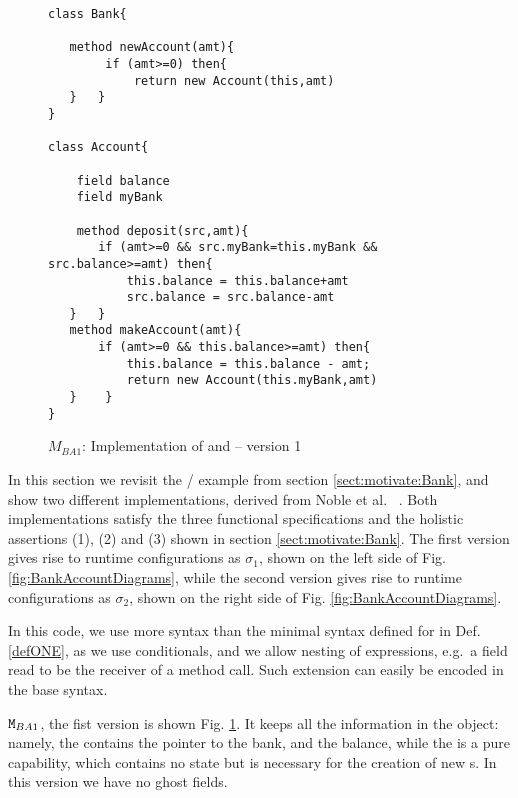 \begin{figure}[thb]
\begin{lstlisting}
class Bank{

   method newAccount(amt){
        if (amt>=0) then{
            return new Account(this,amt)
   }   }
}

class Account{

    field balance
    field myBank
    
    method deposit(src,amt){
       if (amt>=0 && src.myBank=this.myBank && src.balance>=amt) then{
           this.balance = this.balance+amt
           src.balance = src.balance-amt
   }   }
   method makeAccount(amt){
       if (amt>=0 && this.balance>=amt) then{
           this.balance = this.balance - amt;
           return new Account(this.myBank,amt)
   }    }
}
\end{lstlisting}
 \vspace*{-7mm}
\caption{$M_{BA1}$: Implementation of  and  -- version 1}
\label{fig:BanAccImplV1}
\end{figure}

In this section we revisit the / example from
 section  \ref{sect:motivate:Bank}, and show two different
 implementations, derived from Noble et al.\ \cite{arnd18} . Both implementations  satisfy the three functional specifications and the holistic assertions
 (1), (2) and (3)  shown in section \ref{sect:motivate:Bank}.
 The first version gives rise to runtime configurations as $\sigma_1$, 
 shown on the left side of Fig. \ref{fig:BankAccountDiagrams}, while the
 second version gives rise to runtime configurations as $\sigma_2$,
 shown on the right side of Fig. \ref{fig:BankAccountDiagrams}. 

 In this code, we use more syntax than the minimal syntax defined for \LangOO in Def. \ref{defONE}, as we use conditionals, and we allow nesting of expressions, e.g.\ a field read to be the receiver of a method call. Such extension can easily be encoded in the base syntax.

${\mbox{\tt{\ensuremath{{\mbox{\tt{M}}}}}}}_{BA1}$, the fist version is shown Fig. \ref{fig:BanAccImplV1}. It keeps all the information in the  object: namely,
the  contains the pointer to the bank, and the balance, while the  is a pure capability, which contains
no state but is necessary for the creation of new s.
In this version we have no ghost fields.

